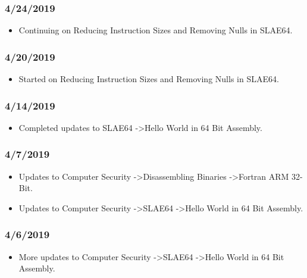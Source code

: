 \subsubsection{4/24/2019}

\begin{itemize}
\item Continuing on Reducing Instruction Sizes and Removing Nulls in SLAE64.
\end{itemize}

\subsubsection{4/20/2019}

\begin{itemize}
\item Started on Reducing Instruction Sizes and Removing Nulls in SLAE64.
\end{itemize}

\subsubsection{4/14/2019}

\begin{itemize}
\item Completed updates to SLAE64 -\textgreater  Hello World in 64 Bit Assembly.
\end{itemize}

\subsubsection{4/7/2019}

\begin{itemize}
\item Updates to Computer Security -\textgreater  Disassembling Binaries -\textgreater  Fortran ARM 32-Bit.
\item Updates to Computer Security -\textgreater  SLAE64 -\textgreater  Hello World in 64 Bit Assembly.
\end{itemize}

\subsubsection{4/6/2019}

\begin{itemize}
\item More updates to Computer Security -\textgreater  SLAE64 -\textgreater  Hello World in 64 Bit Assembly.
\end{itemize}

